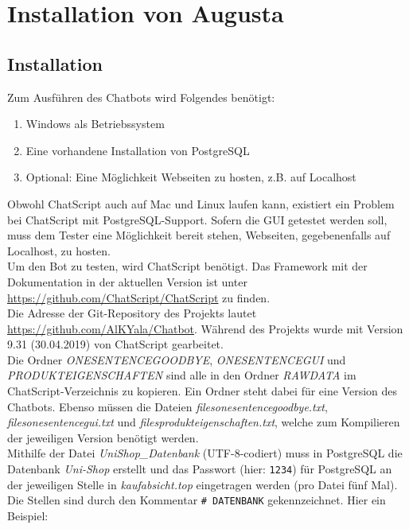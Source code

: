 \chapter{Installation von Augusta}
\label{sec:InstallationAugusta}

\section{Installation}
\label{sec:Installation}

Zum Ausführen des Chatbots wird Folgendes benötigt:

\begin{enumerate}
\item {Windows als Betriebssystem}
\item {Eine vorhandene Installation von PostgreSQL}
\item {Optional: Eine Möglichkeit Webseiten zu hosten, z.B. auf Localhost}
\end{enumerate}

Obwohl ChatScript auch auf Mac und Linux laufen kann, existiert ein Problem bei ChatScript mit PostgreSQL-Support. Sofern die GUI getestet werden soll, muss dem Tester eine Möglichkeit bereit stehen, Webseiten, gegebenenfalls auf Localhost, zu hosten. \\
Um den Bot zu testen, wird ChatScript benötigt. Das Framework mit der Dokumentation in der aktuellen Version ist unter \url{https://github.com/ChatScript/ChatScript} zu finden.\\
Die Adresse der Git-Repository des Projekts lautet \url{https://github.com/AlKYala/Chatbot}. Während des Projekts wurde mit Version 9.31 (30.04.2019) von ChatScript gearbeitet.\\
Die Ordner \textit{ONESENTENCEGOODBYE}, \textit{ONESENTENCEGUI} und \textit{PRODUKTEIGENSCHAFTEN} sind alle in den Ordner \textit{RAWDATA} im ChatScript-Verzeichnis zu kopieren. Ein Ordner steht dabei für eine Version des Chatbots. Ebenso müssen die Dateien \textit{filesonesentencegoodbye.txt}, \textit{filesonesentencegui.txt} und \textit{filesprodukteigenschaften.txt}, welche zum Kompilieren der jeweiligen Version benötigt werden.\\
Mithilfe der Datei \textit{UniShop\_Datenbank} (UTF-8-codiert) muss in PostgreSQL die Datenbank \textit{Uni-Shop} erstellt und das Passwort (hier: \lstinline|1234|) für PostgreSQL an der jeweiligen Stelle in \textit{kaufabsicht.top} eingetragen werden (pro Datei fünf Mal). Die Stellen sind durch den Kommentar \lstinline|# DATENBANK| gekennzeichnet. Hier ein Beispiel:

